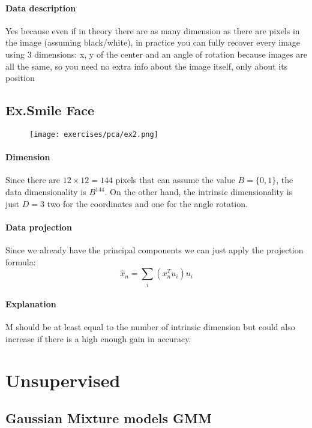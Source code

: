 \paragraph{Data description}
Yes because even if in theory there are as many dimension as there are pixels in the image (assuming black/white), in practice you can fully recover every image using 3 dimensions: x, y of the center and an angle of rotation because images are all the same, so you need no extra info about the image itself, only about its position

\subsection{Ex.Smile Face }

\begin{figure}[H]
    \centering
    \texttt{[image: exercises/pca/ex2.png]}
\end{figure}

\paragraph{Dimension}
Since there are $12\times 12=144$ pixels that can assume the value $B=\{0,1\}$, the data dimensionality is $B^{144} $. On the other hand, the intrinsic dimensionality is just $D=3$ two for the coordinates and one for the angle rotation.

\paragraph{Data projection}
Since we already have the principal components we can just apply the projection formula:
$$\hat{x}_n=\sum_i(x^T_nu_i)u_i$$

\paragraph{Explanation}
M should be at least equal to the number of intrinsic dimension but could also increase if there is a high enough gain in accuracy.



\section{Unsupervised}



\subsection{Gaussian Mixture models GMM}


